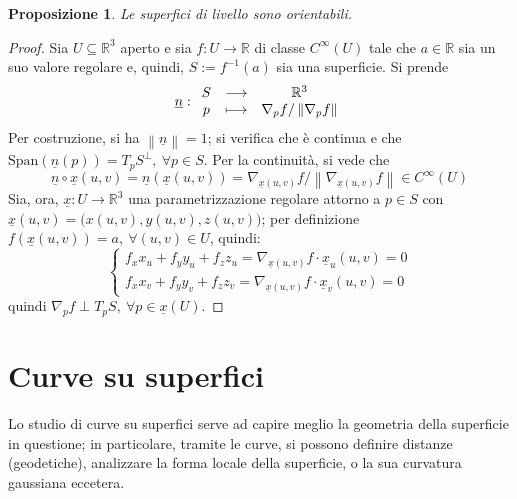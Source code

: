 \documentclass[12pt]{scrartcl}
\theoremstyle{style}
\newtheorem{prop}{Proposizione}[section]
\numberwithin{equation}{subsection}
\begin{document}
\begin{prop}
	Le superfici di livello sono orientabili.
\end{prop}
\begin{proof}
	Sia $U \subseteq \mathbb{R}^3$ aperto e sia $f:U\to \mathbb{R}$ di classe $C^\infty(U)$ tale che $a \in \mathbb{R}$ sia un suo valore regolare e, quindi, $S := f^{-1}(a)$ sia una superficie.
	Si prende 
	\[
	\underline{n}:
	\begin{array}
		{c c c}
		S &\longrightarrow& \mathbb{R}^3\\
		p & \longmapsto & \nabla _p f / \left\lVert \nabla _p f \right\rVert 
	\end{array}
	\] 
	Per costruzione, si ha $\left\lVert \underline{n} \right\rVert =1$; si verifica che \`e continua e che $\mathrm{Span} (\underline{n}(p)) = T_p S^\perp, \ \forall p \in S$.
	Per la continuit\`a, si vede che
	\[
	\underline{n}\circ \underline{x}(u,v) = \underline{n}(\underline{x}(u,v)) = \nabla _{\underline{x}(u,v)} f / \left\lVert \nabla _{\underline{x}(u,v)} f \right\rVert \in C^\infty(U)
	\] 
	Sia, ora, $\underline{x}:U\to \mathbb{R}^3 $ una parametrizzazione regolare attorno a $p \in S$ con $\underline{x}(u,v) = \big(x(u,v) , y(u,v) ,z(u,v)\big)$; per definizione $f(\underline{x}(u,v)) = a, \ \forall (u,v) \in U$, quindi:
	\[
		\begin{cases}
	f_x x_u + f_y y_u + f_z z_u = \nabla _{\underline{x}(u,v)} f \cdot \underline{x}_u(u,v) = 0\\
	f_x x_v + f_y y_v + f_z z_v = \nabla _{\underline{x}(u,v)} f \cdot \underline{x}_v(u,v) = 0
		\end{cases}
	\] 
	quindi $\nabla _p f \perp T_p S, \ \forall p \in \underline{x}(U)$.
\end{proof}
\newpage
\section{Curve su superfici}
Lo studio di curve su superfici serve ad capire meglio la geometria della superficie in questione; in particolare, tramite le curve, si possono definire distanze (geodetiche), analizzare la forma locale della superficie, o la sua curvatura gaussiana eccetera.
\end{document}
